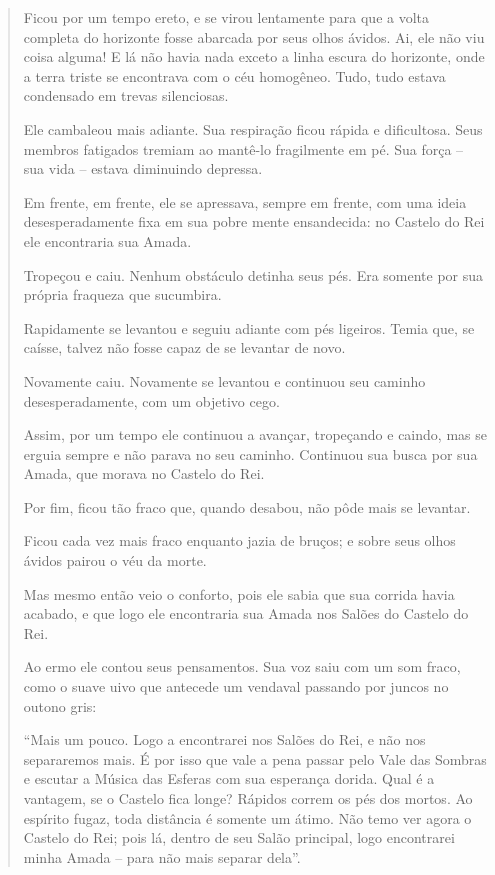 \begin{verse}
Ficou por um tempo ereto, e se virou lentamente para que a volta
completa do horizonte fosse abarcada por seus olhos ávidos. Ai, ele não
viu coisa alguma! E lá não havia nada exceto a linha escura do
horizonte, onde a terra triste se encontrava com o céu homogêneo. Tudo,
tudo estava condensado em trevas silenciosas.

Ele cambaleou mais adiante. Sua respiração ficou rápida e dificultosa.
Seus membros fatigados tremiam ao mantê-lo fragilmente em pé. Sua força
-- sua vida -- estava diminuindo depressa.

Em frente, em frente, ele se apressava, sempre em frente, com uma ideia
desesperadamente fixa em sua pobre mente ensandecida: no Castelo do Rei
ele encontraria sua Amada.

Tropeçou e caiu. Nenhum obstáculo detinha seus pés. Era somente por sua
própria fraqueza que sucumbira.

Rapidamente se levantou e seguiu adiante com pés ligeiros. Temia que, se
caísse, talvez não fosse capaz de se levantar de novo.

Novamente caiu. Novamente se levantou e continuou seu caminho
desesperadamente, com um objetivo cego.

Assim, por um tempo ele continuou a avançar, tropeçando e caindo, mas se
erguia sempre e não parava no seu caminho. Continuou sua busca por sua
Amada, que morava no Castelo do Rei.

Por fim, ficou tão fraco que, quando desabou, não pôde mais se levantar.

Ficou cada vez mais fraco enquanto jazia de bruços; e sobre seus olhos
ávidos pairou o véu da morte.

Mas mesmo então veio o conforto, pois ele sabia que sua corrida havia
acabado, e que logo ele encontraria sua Amada nos Salões do Castelo do
Rei.

Ao ermo ele contou seus pensamentos. Sua voz saiu com um som fraco, como
o suave uivo que antecede um vendaval passando por juncos no outono
gris:

``Mais um pouco. Logo a encontrarei nos Salões do Rei, e não nos
separaremos mais. É por isso que vale a pena passar pelo Vale das
Sombras e escutar a Música das Esferas com sua esperança dorida. Qual é
a vantagem, se o Castelo fica longe? Rápidos correm os pés dos mortos.
Ao espírito fugaz, toda distância é somente um átimo. Não temo ver agora
o Castelo do Rei; pois lá, dentro de seu Salão principal, logo
encontrarei minha Amada -- para não mais separar dela''.


\end{verse}

